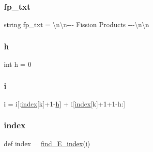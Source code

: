 \mbox{\label{namespaceconv__decaylib_abcdb1a110e2a54bac4567f258e4e314f}} 
\subsubsection{\texorpdfstring{fp\+\_\+txt}{fp\_txt}}
{\footnotesize\ttfamily string fp\+\_\+txt = \textquotesingle{}\textbackslash{}n\textbackslash{}n-\/-\/-\/ Fission Products -\/-\/-\/\textbackslash{}n\textbackslash{}n\textquotesingle{}}

\mbox{\label{namespaceconv__decaylib_a16611451551e3d15916bae723c3f59f7}} 
\subsubsection{\texorpdfstring{h}{h}}
{\footnotesize\ttfamily int h = 0}

\mbox{\label{namespaceconv__decaylib_a7e98b8a17c0aad30ba64d47b74e2a6c1}} 
\subsubsection{\texorpdfstring{i}{i}}
{\footnotesize\ttfamily i = i\mbox{[}\+:\mbox{\hyperlink{namespaceconv__decaylib_ae019b7f667bf67d6499da0fdb77a9504}{index}}\mbox{[}k\mbox{]}+1-\/\mbox{\hyperlink{namespaceconv__decaylib_a16611451551e3d15916bae723c3f59f7}{h}}\mbox{]} + i\mbox{[}\mbox{\hyperlink{namespaceconv__decaylib_ae019b7f667bf67d6499da0fdb77a9504}{index}}\mbox{[}k\mbox{]}+1+1-\/h\+:\mbox{]}}

\mbox{\label{namespaceconv__decaylib_ae019b7f667bf67d6499da0fdb77a9504}} 
\subsubsection{\texorpdfstring{index}{index}}
{\footnotesize\ttfamily def index = \mbox{\hyperlink{namespaceconv__decaylib_a31ae3d7707e0cca60003416efdf39a14}{find\+\_\+\+E\+\_\+index}}(\mbox{\hyperlink{namespaceconv__decaylib_a7e98b8a17c0aad30ba64d47b74e2a6c1}{i}})}

